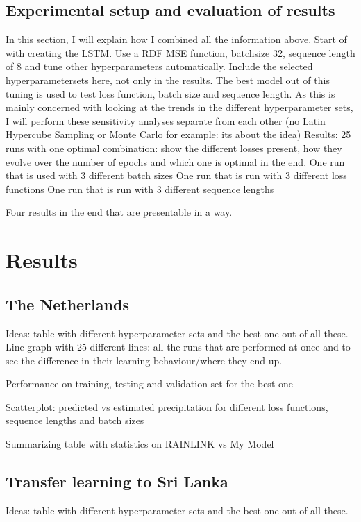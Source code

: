 \documentclass[twocolumn, 10pt, a4paper]{memoir}
\begin{document}
	\section{Experimental setup and evaluation of results} \label{EvalStats}
	In this section, I will explain how I combined all the information above. 
	Start of with creating the LSTM. Use a RDF MSE function, batchsize 32, sequence length of 8 and tune other hyperparameters automatically. Include the selected hyperparametersets here, not only in the results.
	The best model out of this tuning is used to test loss function, batch size and sequence length. As this is mainly concerned with looking at the trends in the different hyperparameter sets, I will perform these sensitivity analyses separate from each other (no Latin Hypercube Sampling or Monte Carlo for example: its about the idea)
	Results: 25 runs with one optimal combination: show the different losses present, how they evolve over the number of epochs and which one is optimal in the end.
	One run that is used with 3 different batch sizes
	One run that is run with 3 different loss functions
	One run that is run with 3 different sequence lengths
	
	Four results in the end that are presentable in a way.

	
	
	\chapter{Results} \label{ch: results}
	\section{The Netherlands}
	Ideas: table with different hyperparameter sets and the best one out of all these.
	Line graph with 25 different lines: all the runs that are performed at once and to see the difference in their learning behaviour/where they end up.
	
	Performance on training, testing and validation set for the best one
	
	Scatterplot: predicted vs estimated precipitation for different loss functions, sequence lengths and batch sizes
	
	Summarizing table with statistics on RAINLINK vs My Model
	
	\section{Transfer learning to Sri Lanka}
	Ideas: table with different hyperparameter sets and the best one out of all these.
	
\end{document}
